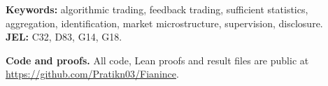 \noindent\textbf{Keywords:} algorithmic trading, feedback trading, sufficient statistics, aggregation, identification, market microstructure, supervision, disclosure.\\
\textbf{JEL:} C32, D83, G14, G18.

\noindent\textbf{Code and proofs.} All code, Lean proofs and result files are public at \url{https://github.com/Pratikn03/Fianince}.

\endgroup
\newpage
\pagestyle{fancy}
\setcounter{page}{1}
